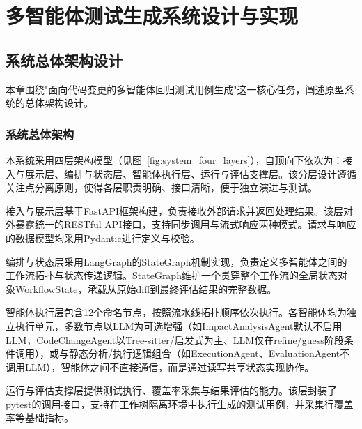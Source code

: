 
\chapter{多智能体测试生成系统设计与实现}
\section{系统总体架构设计}
本章围绕"面向代码变更的多智能体回归测试用例生成"这一核心任务，阐述原型系统的总体架构设计。
\subsection{系统总体架构}
本系统采用四层架构模型（见图~\ref{fig:system_four_layers}），自顶向下依次为：接入与展示层、编排与状态层、智能体执行层、运行与评估支撑层。该分层设计遵循关注点分离原则，使得各层职责明确、接口清晰，便于独立演进与测试。

接入与展示层基于FastAPI框架构建，负责接收外部请求并返回处理结果。该层对外暴露统一的RESTful API接口，支持同步调用与流式响应两种模式。请求与响应的数据模型均采用Pydantic进行定义与校验。

编排与状态层采用LangGraph的StateGraph机制实现，负责定义多智能体之间的工作流拓扑与状态传递逻辑。StateGraph维护一个贯穿整个工作流的全局状态对象WorkflowState，承载从原始diff到最终评估结果的完整数据。

智能体执行层包含12个命名节点，按照流水线拓扑顺序依次执行。各智能体均为独立执行单元，多数节点以LLM为可选增强（如ImpactAnalysisAgent默认不启用LLM，CodeChangeAgent以Tree-sitter/启发式为主、LLM仅在refine/guess阶段条件调用），或与静态分析/执行逻辑组合（如ExecutionAgent、EvaluationAgent不调用LLM），智能体之间不直接通信，而是通过读写共享状态实现协作。

运行与评估支撑层提供测试执行、覆盖率采集与结果评估的能力。该层封装了pytest的调用接口，支持在工作树隔离环境中执行生成的测试用例，并采集行覆盖率等基础指标。

